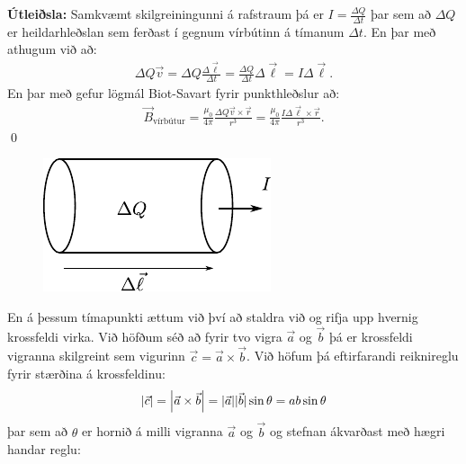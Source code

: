 \textbf{Útleiðsla:} Samkvæmt skilgreiningunni á rafstraum þá er $I = \frac{\Delta Q}{\Delta t}$ þar sem að $\Delta Q$ er heildarhleðslan sem ferðast í gegnum vírbútinn á tímanum $\Delta t$. En þar með athugum við að:
\begin{align*}
    \Delta Q  \vec{v} = \Delta Q \frac{\Delta \vec{\ell}}{\Delta t} = \frac{\Delta Q}{\Delta t} \Delta \vec{\ell} = I \Delta \vec{\ell}.
\end{align*}
En þar með gefur lögmál Biot-Savart fyrir punkthleðslur að:
\begin{align*}
    \vec{B}_{\text{vírbútur}} = \frac{\mu_0}{4\pi} \frac{\Delta Q \vec{v} \times \vec{r}}{r^3} = \frac{\mu_0}{4\pi} \frac{I \Delta \vec{\ell} \times \vec{r}}{r^3}.
\end{align*}
\qed

\begin{figure}[H]
    \centering
    \includegraphics{figures/biot2.pdf}
\end{figure}

En á þessum tímapunkti ættum við því að staldra við og rifja upp hvernig krossfeldi virka. Við höfðum séð að fyrir tvo vigra $\vec{a}$ og $\vec{b}$ þá er krossfeldi vigranna skilgreint sem vigurinn $\vec{c} = \vec{a} \times \vec{b}$. Við höfum þá eftirfarandi reiknireglu fyrir stærðina á krossfeldinu:
\begin{align*}
    \abs{\vec{c}} = \abs{\vec{a} \times \vec{b}} = |\vec{a}||\vec{b}|\sin\theta = ab\sin\theta
\end{align*}
þar sem að $\theta$ er hornið á milli vigranna $\vec{a}$ og $\vec{b}$ og stefnan ákvarðast með hægri handar reglu:

